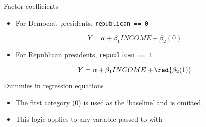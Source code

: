 \documentclass[t]{beamer}
\begin{document}
	\begin{frame}[c]{Factor coefficients}
	
		\begin{block}{}
			
			\begin{itemize}
				\item For Democrat presidents, \texttt{republican == 0}
				
				$$Y = \alpha + \beta_1 INCOME + \beta_2 (0)$$
				
				\item For Republican presidents, \texttt{republican == 1}
				
				$$Y = \alpha + \beta_1 INCOME + \red{ \beta_2 (1) }$$
				
			\end{itemize}
						
		\end{block}
		
		\begin{block}{Dummies in regression equations}
			
			\begin{itemize}
			
				\item The first category (0) is used as the `baseline' and is omitted.
				\item This logic applies to any variable passed to  with 

			\end{itemize}
			
		\end{block}
	
	\end{frame}
	
\end{document}
